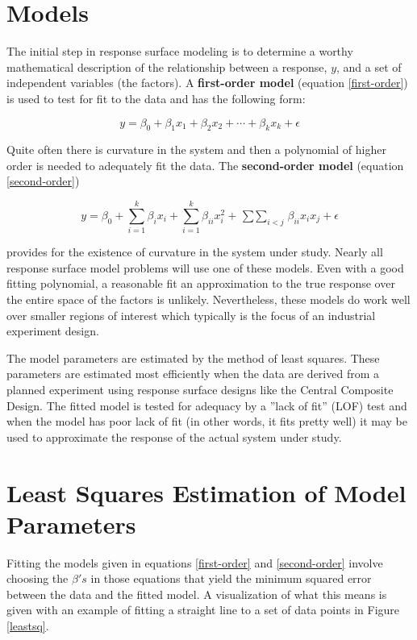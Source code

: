 \section{Models}
The initial step in response surface modeling is to determine a worthy mathematical description of the relationship between a response, $y$, and a set of independent variables (the factors). A \textbf{first-order model} (equation \ref{first-order}) is used to test for fit to the data and has the following form:

\begin{equation}\label{first-order}
y = \beta_{0} + \beta_{1} x_{1} + \beta_{2} x_{2} + \cdots + \beta_{k} x_{k} + \epsilon
\end{equation}

Quite often there is curvature in the system and then a polynomial of higher order is needed to adequately fit the data.  The \textbf{second-order model} (equation \ref{second-order})

\def\doublesum{\mathop{\sum\!\sum}}
\begin{equation}\label{second-order}
y = \beta_{0} + \sum_{i=1}^k \beta_{i} x_{i} + \sum_{i=1}^k \beta_{ii} x^{2}_{i} + \doublesum_{i<j} \beta_{ii} x_{i}x_{j} + \epsilon
\end{equation}

provides for the existence of curvature in the system under study. Nearly all response surface model problems will use one of these models.  Even with a good fitting polynomial, a reasonable fit an approximation to the true response over the entire space of the factors is unlikely.  Nevertheless, these models do work well over smaller regions of interest which typically is the focus of an industrial experiment design.

The model parameters are estimated by the method of least squares.  These parameters are estimated most efficiently when the data are derived from a planned experiment using response surface designs like the Central Composite Design. The fitted model is tested for adequacy by a ''lack of fit'' (LOF) test and when the model has poor lack of fit (in other words, it fits pretty well) it may be used to approximate the response of the actual system under study.   

\section{Least Squares Estimation of Model Parameters}
Fitting the models given in equations \ref{first-order} and \ref{second-order} involve choosing the $\beta's $ in those equations that yield the minimum squared error between the data and the fitted model. A visualization of what this means is given with an example of fitting a straight line to a set of data points in Figure \ref{leastsq}.  

